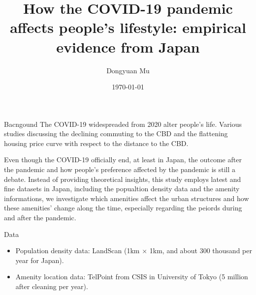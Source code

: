 \documentclass[aspectratio=169,xcolor=dvipsnames]{beamer}
\title[short title]{How the COVID-19 pandemic affects people's lifestyle: empirical evidence from Japan} %
\author[Pin-Yen] {Dongyuan Mu}
\institute[NTU] %
{
	Graduate School of Economics\\
	University of Tokyo 
}
\date{\today} %
\begin{document}
	\begin{frame}
		\maketitle
	\end{frame}
\begin{frame}{Bacngound}
		The COVID-19 widespreaded from 2020 alter people's life. Various studies discussing the declining commuting to the CBD and the flattening housing price curve with respect to the distance to the CBD.\par 
		Even though the COVID-19 officially end, at least in Japan, the outcome after the pandemic and how people's preference affected by the pandemic is still a debate. Instead of providing theoretical insights, this study employs latest and fine datasets in Japan, including the popualtion density data and the amenity informations, we investigate which amenities affect the urban structures and how these amenities' change along the time, especially regarding the peiords during and after the pandemic.
\end{frame}
\begin{frame}{Data}
\begin{itemize}
	\item Population density data: LandScan (1km $\times$ 1km, and about 300 thousand per year for Japan).
	\item Amenity location data: TelPoint from CSIS in University of Tokyo (5 million after cleaning per year). 
\end{itemize}
\end{frame}
\end{document}
